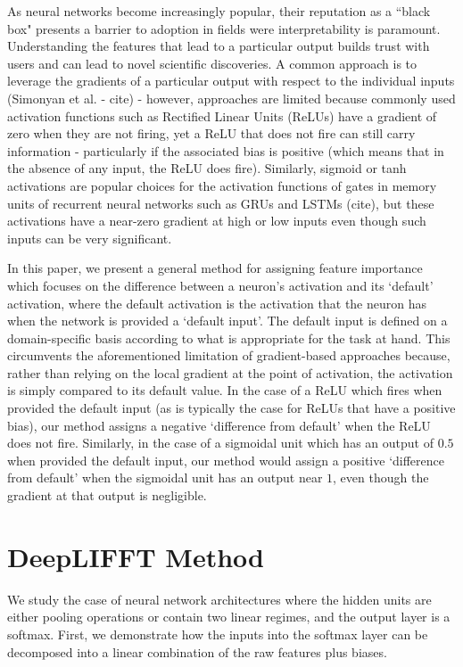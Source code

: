 \documentclass{article}
\begin{document}
As neural networks become increasingly popular, their reputation as a ``black box" presents a barrier to adoption in fields were interpretability is paramount. Understanding the features that lead to a particular output builds trust with users and can lead to novel scientific discoveries. A common approach is to leverage the gradients of a particular output with respect to the individual inputs (Simonyan et al. - cite) - however, approaches are limited because commonly used activation functions such as Rectified Linear Units (ReLUs) have a gradient of zero when they are not firing, yet a ReLU that does not fire can still carry information - particularly if the associated bias is positive (which means that in the absence of any input, the ReLU does fire). Similarly, sigmoid or tanh activations are popular choices for the activation functions of gates in memory units of recurrent neural networks such as GRUs and LSTMs (cite), but these activations have a near-zero gradient at high or low inputs even though such inputs can be very significant.

In this paper, we present a general method for assigning feature importance which focuses on the difference between a neuron's activation and its `default' activation, where the default activation is the activation that the neuron has when the network is provided a `default input'. The default input is defined on a domain-specific basis according to what is appropriate for the task at hand. This circumvents the aforementioned limitation of gradient-based approaches because, rather than relying on the local gradient at the point of activation, the activation is simply compared to its default value. In the case of a ReLU which fires when provided the default input (as is typically the case for ReLUs that have a positive bias), our method assigns a negative `difference from default' when the ReLU does not fire. Similarly, in the case of a sigmoidal unit which has an output of $0.5$ when provided the default input, our method would assign a positive `difference from default' when the sigmoidal unit has an output near $1$, even though the gradient at that output is negligible.

\section{DeepLIFFT Method}
\label{DeepLIFFT}

We study the case of neural network architectures where the hidden units are either pooling operations or contain two linear regimes, and the output layer is a softmax. First, we demonstrate how the inputs into the softmax layer can be decomposed into a linear combination of the raw features plus biases.
\end{document}
